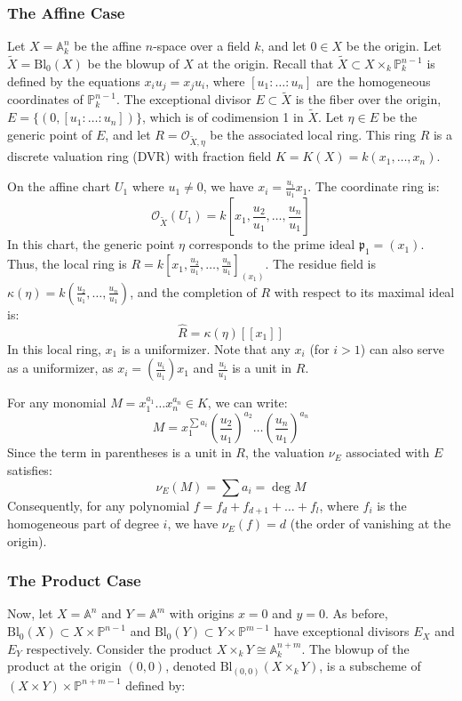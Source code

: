 \subsubsection*{The Affine Case}
Let $X = \mathbb{A}_k^n$ be the affine $n$-space over a field $k$, and let $0 \in X$ be the origin.
Let $\tilde{X} = \text{Bl}_0(X)$ be the blowup of $X$ at the origin.
Recall that $\tilde{X} \subset X \times_k \mathbb{P}^{n-1}_k$ is defined by the equations $x_i u_j = x_j u_i$, where $[u_1 : \dots : u_n]$ are the homogeneous coordinates of
$\mathbb{P}^{n-1}_k$.
The exceptional divisor $E \subset \tilde{X}$ is the fiber over the origin, $E = \{ (0, [u_1 : \dots : u_n]) \}$, which is of codimension 1 in $\tilde{X}$.
Let $\eta \in E$ be the generic point of $E$, and let $R = \mathcal{O}_{\tilde{X}, \eta}$ be the associated local ring.
This ring $R$ is a discrete valuation ring (DVR) with fraction field $K = K(X) = k(x_1, \dots, x_n)$.

On the affine chart $U_1$ where $u_1 \neq 0$, we have $x_i = \frac{u_i}{u_1} x_1$.
The coordinate ring is:$$\mathcal{O}_{\tilde{X}}(U_1) = k\left[x_1, \frac{u_2}{u_1}, \dots, \frac{u_n}{u_1}\right]$$
In this chart, the generic point $\eta$ corresponds to the prime ideal $\mathfrak{p}_1 = (x_1)$. Thus, the local ring is $R = k[x_1, \frac{u_2}{u_1}, \dots, \frac{u_n}{u_1}]_{(x_1)}$.
The residue field is $\kappa(\eta) = k(\frac{u_2}{u_1}, \dots, \frac{u_n}{u_1})$, and the completion of $R$ with respect to its maximal ideal is:
$$\hat{R} = \kappa(\eta)[[x_1]]$$
In this local ring, $x_1$ is a uniformizer. Note that any $x_i$ (for $i > 1$) can also serve as a uniformizer,
as $x_i = (\frac{u_i}{u_1}) x_1$ and $\frac{u_i}{u_1}$ is a unit in $R$.

For any monomial $M = x_1^{a_1} \dots x_n^{a_n} \in K$, we can write:
$$M = x_1^{\sum a_i} \left( \frac{u_2}{u_1} \right)^{a_2} \dots \left( \frac{u_n}{u_1} \right)^{a_n}$$
Since the term in parentheses is a unit in $R$, the valuation $\nu_E$ associated with $E$ satisfies:
$$\nu_E(M) = \sum a_i = \deg M$$
Consequently, for any polynomial $f = f_d + f_{d+1} + \dots + f_l$, where $f_i$ is the homogeneous part of degree $i$, we have $\nu_E(f) = d$ (the order of vanishing at the origin).

\subsubsection*{The Product Case}
Now, let $X = \mathbb{A}^n$ and $Y = \mathbb{A}^m$ with origins $x=0$ and $y=0$.
As before, $\text{Bl}_0(X) \subset X \times \mathbb{P}^{n-1}$ and $\text{Bl}_0(Y) \subset Y \times \mathbb{P}^{m-1}$ have exceptional divisors $E_X$ and $E_Y$ respectively.
Consider the product $X \times_k Y \cong \mathbb{A}_k^{n+m}$.
The blowup of the product at the origin $(0,0)$, denoted $\text{Bl}_{(0,0)}(X \times_k Y)$, is a subscheme of $(X \times Y) \times \mathbb{P}^{n+m-1}$ defined by:


